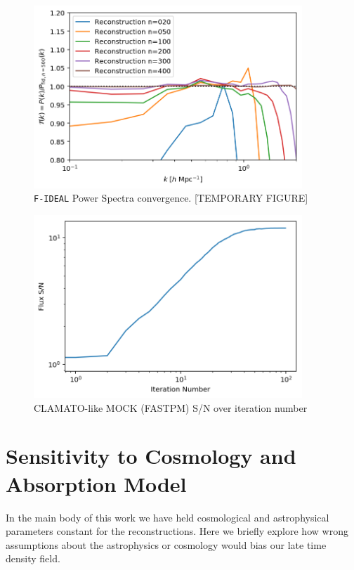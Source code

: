 \documentclass[times]{aastex62}
\begin{document}
\begin{figure}
  \centering  \includegraphics[trim=0cm 0cm 0cm 0cm,width=0.90\textwidth]{./appendix_figures/transfer_iterations.png}
    \caption{\texttt{F-IDEAL} Power Spectra convergence. [TEMPORARY FIGURE]} 
    \label{fig_sims2x2}
\end{figure}


\begin{figure}
  \centering  \includegraphics[trim=0cm 0cm 0cm 0cm,width=0.90\textwidth]{./figs_fastpm/flux_sn.png}
    \caption{CLAMATO-like MOCK (FASTPM) S/N over iteration number} 
    \label{fig_sims2x2}
\end{figure}




\section{Sensitivity to Cosmology and Absorption Model}
\label{app:sens}

In the main body of this work we have held cosmological and astrophysical parameters constant for the reconstructions. Here we briefly explore how wrong assumptions about the astrophysics or cosmology would bias our late time density field. 
\end{document}
